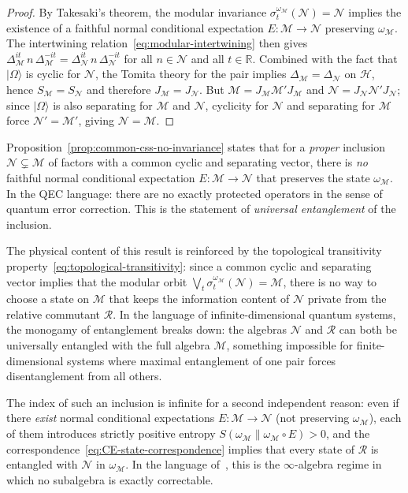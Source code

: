 \documentclass[a4paper,11pt]{article}
\theoremstyle{definition}
\begin{document}
\begin{proof}
By Takesaki's theorem, the modular invariance
$\sigma_t^{\omega_\mathcal{M}}(\mathcal{N})=\mathcal{N}$ implies the existence of a
faithful normal conditional expectation $E:\mathcal{M}\to\mathcal{N}$ preserving
$\omega_\mathcal{M}$.  The intertwining relation~\eqref{eq:modular-intertwining} then
gives $\Delta_\mathcal{M}^{it}\,n\,\Delta_\mathcal{M}^{-it}=\Delta_\mathcal{N}^{it}\,n\,\Delta_\mathcal{N}^{-it}$
for all $n\in\mathcal{N}$ and all $t\in\mathbb{R}$.  Combined with the fact that
$|\Omega\rangle$ is cyclic for $\mathcal{N}$, the Tomita theory for the pair implies
$\Delta_\mathcal{M}=\Delta_\mathcal{N}$ on $\mathcal{H}$, hence $S_\mathcal{M}=S_\mathcal{N}$
and therefore $J_\mathcal{M}=J_\mathcal{N}$.  But $\mathcal{M}=J_\mathcal{M}\mathcal{M}'J_\mathcal{M}$
and $\mathcal{N}=J_\mathcal{N}\mathcal{N}'J_\mathcal{N}$; since $|\Omega\rangle$ is also
separating for $\mathcal{M}$ and $\mathcal{N}$, cyclicity for $\mathcal{N}$ and
separating for $\mathcal{M}$ force $\mathcal{N}'=\mathcal{M}'$, giving $\mathcal{N}=\mathcal{M}$.
\end{proof}

\noindent Proposition~\ref{prop:common-css-no-invariance} states that for a \emph{proper}
inclusion $\mathcal{N}\subsetneq\mathcal{M}$ of factors with a common cyclic and
separating vector, there is \emph{no} faithful normal conditional expectation
$E:\mathcal{M}\to\mathcal{N}$ that preserves the state $\omega_\mathcal{M}$.  In the
QEC language: there are no exactly protected operators in the sense of quantum error
correction.  This is the statement of \emph{universal entanglement} of the inclusion.

The physical content of this result is reinforced by the topological transitivity
property~\eqref{eq:topological-transitivity}: since a common cyclic and separating vector
implies that the modular orbit $\bigvee_t\sigma_t^{\omega_\mathcal{M}}(\mathcal{N})=\mathcal{M}$,
there is no way to choose a state on $\mathcal{M}$ that keeps the information content
of $\mathcal{N}$ private from the relative commutant $\mathcal{R}$.  In the language of
infinite-dimensional quantum systems, the monogamy of entanglement breaks down: the
algebras $\mathcal{N}$ and $\mathcal{R}$ can both be universally entangled with the full
algebra $\mathcal{M}$, something impossible for finite-dimensional systems where maximal
entanglement of one pair forces disentanglement from all others.

The index of such an inclusion is infinite for a second independent reason: even if
there \emph{exist} normal conditional expectations $E:\mathcal{M}\to\mathcal{N}$
(not preserving $\omega_\mathcal{M}$), each of them introduces strictly positive entropy
$S(\omega_\mathcal{M}\|\omega_\mathcal{M}\circ E)>0$, and the correspondence~\eqref{eq:CE-state-correspondence}
implies that every state of $\mathcal{R}$ is entangled with $\mathcal{N}$ in
$\omega_\mathcal{M}$.  In the language of~\cite{WittenPenington}, this is the
$\infty$-algebra regime in which no subalgebra is exactly correctable.
\end{document}
